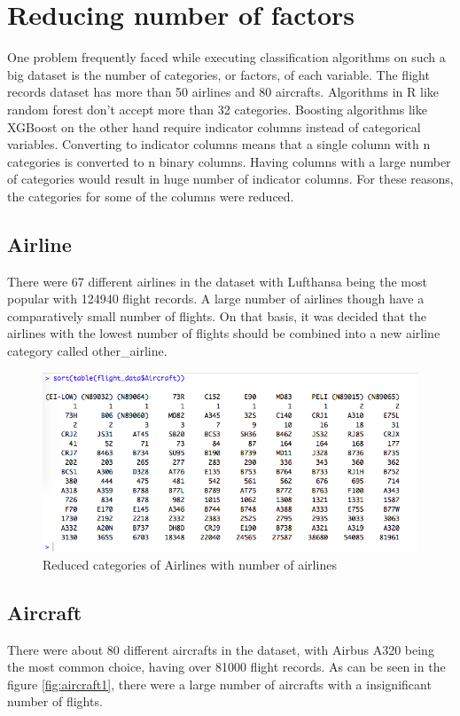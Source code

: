 \section{Reducing number of factors}
One problem frequently faced while executing classification algorithms on such a big dataset is the number of categories, or factors, of each variable. The flight records dataset has more than 50 airlines and 80 aircrafts. Algorithms in R like random forest don't accept more than 32 categories. Boosting algorithms like XGBoost on the other hand require indicator columns instead of categorical variables. Converting to indicator columns means that a single column with n categories is converted to n binary columns. Having columns with a large number of categories would result in huge number of indicator columns. For these reasons, the categories for some of the columns were reduced.

\subsection{Airline}
There were 67 different airlines in the dataset with Lufthansa being the most popular with 124940 flight records. A large number of airlines though have a comparatively small number of flights. On that basis, it was decided that the airlines with the lowest number of flights should be combined into a new airline category called other\_airline.

\begin{figure}[H]
    \centering
    \includegraphics[width=\textwidth]{Figures/Aircraft_orig_levels.png}
    \caption{Reduced categories of Airlines with number of airlines}
    \label{fig:airline2}
\end{figure}

\subsection{Aircraft}
There were about 80 different aircrafts in the dataset, with Airbus A320 being the most common choice, having over 81000 flight records. As can be seen in the figure \ref{fig:aircraft1}, there were a large number of aircrafts with a insignificant number of flights.

